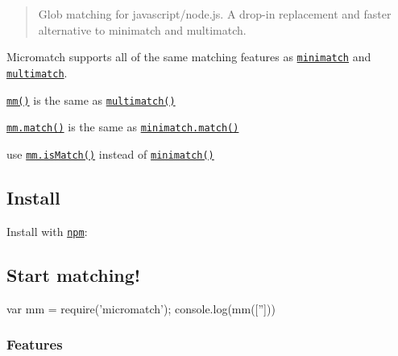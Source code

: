 \begin{quote}
Glob matching for javascript/node.\+js. A drop-\/in replacement and faster alternative to minimatch and multimatch. \end{quote}


Micromatch supports all of the same matching features as \href{https://github.com/isaacs/minimatch}{\tt minimatch} and \href{https://github.com/sindresorhus/multimatch}{\tt multimatch}.


\begin{DoxyItemize}
\item \href{#usage}{\tt mm()} is the same as \href{https://github.com/sindresorhus/multimatch}{\tt multimatch()}
\item \href{#match}{\tt mm.\+match()} is the same as \href{https://github.com/isaacs/minimatch}{\tt minimatch.\+match()}
\item use \href{#ismatch}{\tt mm.\+is\+Match()} instead of \href{https://github.com/isaacs/minimatch}{\tt minimatch()}
\end{DoxyItemize}

\subsection*{Install}

Install with \href{https://www.npmjs.com/}{\tt npm}\+:




\subsection*{Start matching!}


\begin{DoxyCode}
var mm = require('micromatch');
console.log(mm(['']))
\end{DoxyCode}






\subsubsection*{Features}


